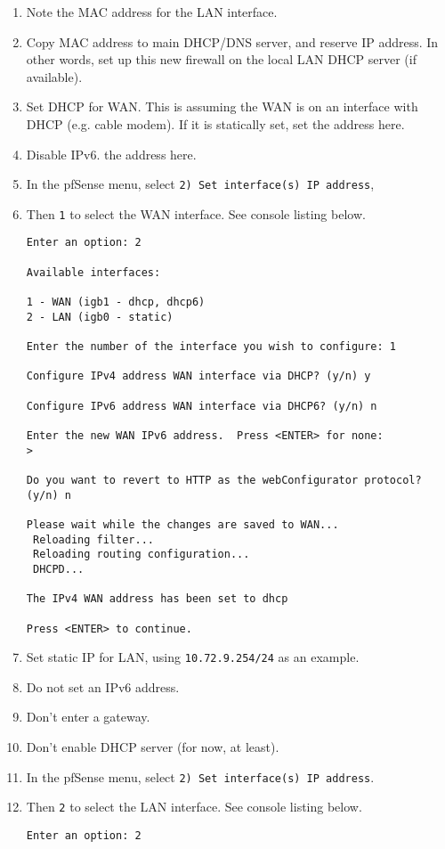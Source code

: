 \begin{enumerate}
 \item Note the MAC address for the LAN interface.
 \item Copy MAC address to main DHCP/DNS server, and reserve IP address. In other words, set up this new firewall on the local LAN DHCP server (if available).
 \item Set DHCP for WAN. This is assuming the WAN is on an interface with DHCP (e.g. cable modem). If it is statically set, set
the address here.
 \item Disable IPv6.
the address here.
 \item In the pfSense menu, select \texttt{2) Set interface(s) IP address},
 \item Then \texttt{1} to select the WAN interface. See console listing below.

\begin{verbatim}
Enter an option: 2

Available interfaces:

1 - WAN (igb1 - dhcp, dhcp6)
2 - LAN (igb0 - static)

Enter the number of the interface you wish to configure: 1

Configure IPv4 address WAN interface via DHCP? (y/n) y

Configure IPv6 address WAN interface via DHCP6? (y/n) n

Enter the new WAN IPv6 address.  Press <ENTER> for none:
> 

Do you want to revert to HTTP as the webConfigurator protocol? (y/n) n

Please wait while the changes are saved to WAN...
 Reloading filter...
 Reloading routing configuration...
 DHCPD...

The IPv4 WAN address has been set to dhcp

Press <ENTER> to continue.
\end{verbatim}

 \item Set static IP for LAN, using \texttt{10.72.9.254/24} as an example.
 \item Do not set an IPv6 address.
 \item Don't enter a gateway.
 \item Don't enable DHCP server (for now, at least).
 \item In the pfSense menu, select \texttt{2) Set interface(s) IP address}.
 \item Then \texttt{2} to select the LAN interface. See console listing below.
\begin{verbatim}
Enter an option: 2


\end{verbatim}
\end{enumerate}
